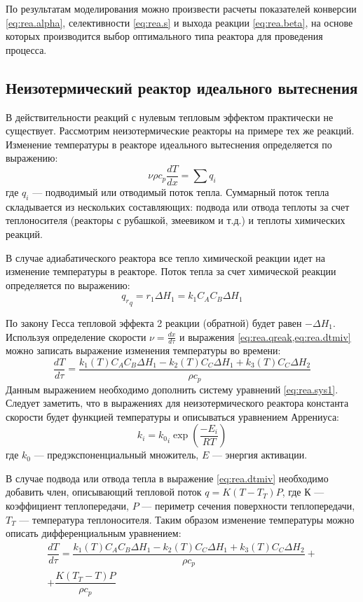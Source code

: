 По результатам моделирования можно произвести расчеты показателей конверсии \eqref{eq:rea.alpha}, селективности \eqref{eq:rea.s} и выхода реакции \eqref{eq:rea.beta}, на основе которых производится выбор оптимального типа реактора для проведения процесса. 

\subsection*{Неизотермический реактор идеального вытеснения}
В действительности реакций с нулевым тепловым эффектом практически не существует. Рассмотрим неизотермические реакторы на примере тех же реакций.
Изменение температуры в реакторе идеального вытеснения определяется по выражению:
\begin{equation}\label{eq:rea.dtmiv}
	\nu \rho c_p \dfrac{d T}{d x} = \sum q_i
\end{equation}
где $q_i$ --- подводимый или отводимый поток тепла. Суммарный поток тепла складывается из нескольких составляющих: подвода или отвода теплоты за счет теплоносителя (реакторы с рубашкой, змеевиком и т.д.) и теплоты химических реакций. 

В случае адиабатического реактора все тепло химической реакции идет на изменение температуры в реакторе. Поток тепла за счет химической реакции определяется по выражению:
\begin{equation} \label{eq:rea.qreak}
	{q_r}_q=r_1 \Delta H_1 = k_1 C_A C_B \Delta H_1
\end{equation}

По закону Гесса тепловой эффекта 2 реакции (обратной) будет равен $-\Delta H_1$. Используя определение скорости $\nu=\frac{d x }{d \tau}$ и выражения \ref{eq:rea.qreak,eq:rea.dtmiv} можно записать выражение изменения температуры во времени:
\begin{equation}\label{eq:rea.dtmiv1}
	\dfrac{d T}{d \tau}= \dfrac {k_1(T) C_A C_B \Delta H_1 -k_2(T) C_C \Delta H_1 +k_3(T) C_C \Delta H_2}{\rho c_p} 
\end{equation}
Данным выражением необходимо дополнить систему уравнений \ref{eq:rea.sys1}. Следует заметить, что в выражениях для  неизотермического реактора константа скорости будет функцией температуры и описываться уравнением Аррениуса:
\begin{equation}
	k_i={k_0}_i \exp \left( \dfrac{-E_i}{RT}\right)
\end{equation}
где $k_0$ --- предэкспоненциальный множитель,  $E$ --- энергия активации.

В случае подвода или отвода тепла в выражение \eqref{eq:rea.dtmiv} необходимо добавить член, описывающий тепловой поток $q=K(T-T_T)P$, где $К$ --- коэффициент теплопередачи, $P$ --- периметр сечения поверхности теплопередачи, $T_T$ --- температура теплоносителя. Таким образом изменение температуры можно описать дифференциальным уравнением:
\begin{eqnarray}\label{eq:rea.dtmiv2}
\dfrac{d T}{d \tau}= \dfrac {k_1(T) C_A C_B \Delta H_1 -k_2(T) C_C \Delta H_1 +k_3(T) C_C \Delta H_2}{\rho c_p} + \nonumber \\ + \dfrac{K(T_T-T)P}{\rho c_p} \quad
\end{eqnarray}

